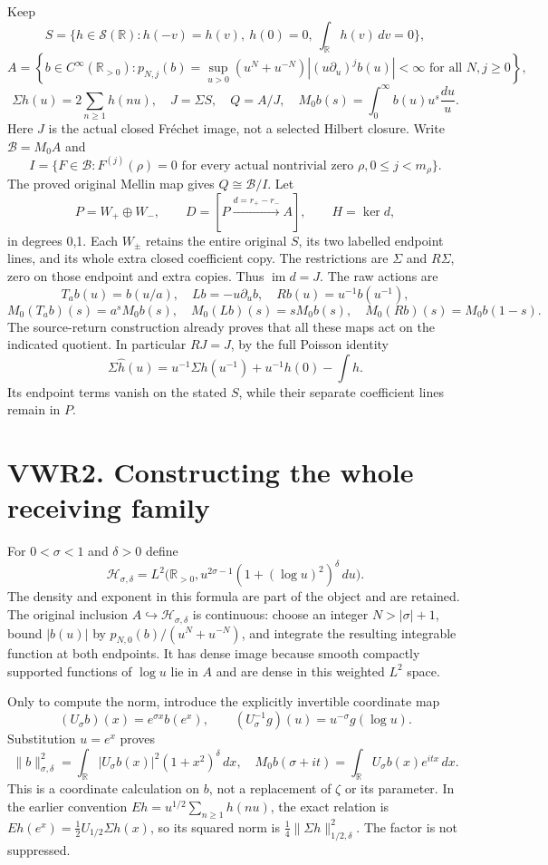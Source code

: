 Keep \[
S=\{h\in\mathcal S(\mathbb R):h(-v)=h(v),\ h(0)=0,\ \int_{\mathbb R}h(v)\,dv=0\},
\] \[
A=\left\{b\in C^\infty(\mathbb R_{>0}):
 p_{N,j}(b)=\sup_{u>0}(u^N+u^{-N})|(u\partial_u)^jb(u)|<\infty
 \text{ for all }N,j\ge0\right\},
\] \[
\Sigma h(u)=2\sum_{n\ge1}h(nu),\quad J=\Sigma S,\quad Q=A/J,
\quad M_0b(s)=\int_0^\infty b(u)u^s\frac{du}{u}.
\tag{VWR1.1}
\] Here \(J\) is the actual closed Fréchet image, not a selected Hilbert
closure. Write \(\mathcal B=M_0A\) and \[
I=\{F\in\mathcal B:F^{(j)}(\rho)=0\text{ for every actual nontrivial zero }\rho,
 0\le j<m_\rho\}.
\] The proved original Mellin map gives \(Q\cong\mathcal B/I\). Let \[
P=W_+\oplus W_-,\qquad D=[P\xrightarrow{d=r_+-r_-}A],\qquad H=\ker d,
\tag{VWR1.2}
\] in degrees 0,1. Each \(W_\pm\) retains the entire original \(S\), its
two labelled endpoint lines, and its whole extra closed coefficient
copy. The restrictions are \(\Sigma\) and \(R\Sigma\), zero on those
endpoint and extra copies. Thus \(\operatorname{im}d=J\). The raw
actions are \[
T_ab(u)=b(u/a),\quad Lb=-u\partial_ub,\quad Rb(u)=u^{-1}b(u^{-1}),
\] \[
M_0(T_ab)(s)=a^sM_0b(s),\quad M_0(Lb)(s)=sM_0b(s),\quad
M_0(Rb)(s)=M_0b(1-s).
\tag{VWR1.3}
\] The source-return construction already proves that all these maps act
on the indicated quotient. In particular \(RJ=J\), by the full Poisson
identity \[
\Sigma\widehat h(u)=u^{-1}\Sigma h(u^{-1})+u^{-1}h(0)-\int h.
\tag{VWR1.4}
\] Its endpoint terms vanish on the stated \(S\), while their separate
coefficient lines remain in \(P\).

\section{VWR2. Constructing the whole receiving
family}\label{vwr2.-constructing-the-whole-receiving-family}

For \(0<\sigma<1\) and \(\delta>0\) define \[
\mathcal H_{\sigma,\delta}
=L^2\bigl(\mathbb R_{>0},u^{2\sigma-1}(1+(\log u)^2)^\delta\,du\bigr).
\tag{VWR2.1}
\] The density and exponent in this formula are part of the object and
are retained. The original inclusion
\(A\hookrightarrow\mathcal H_{\sigma,\delta}\) is continuous: choose an
integer \(N>|\sigma|+1\), bound \(|b(u)|\) by
\(p_{N,0}(b)/(u^N+u^{-N})\), and integrate the resulting integrable
function at both endpoints. It has dense image because smooth compactly
supported functions of \(\log u\) lie in \(A\) and are dense in this
weighted \(L^2\) space.

Only to compute the norm, introduce the explicitly invertible coordinate
map \[
(U_\sigma b)(x)=e^{\sigma x}b(e^x),\qquad
(U_\sigma^{-1}g)(u)=u^{-\sigma}g(\log u).
\] Substitution \(u=e^x\) proves \[
\|b\|_{\sigma,\delta}^2
=\int_{\mathbb R}|U_\sigma b(x)|^2(1+x^2)^\delta\,dx,
\quad
M_0b(\sigma+it)=\int_{\mathbb R}U_\sigma b(x)e^{itx}\,dx.
\tag{VWR2.2}
\] This is a coordinate calculation on \(b\), not a replacement of
\(\zeta\) or its parameter. In the earlier convention
\(Eh=u^{1/2}\sum_{n\ge1}h(nu)\), the exact relation is
\(E h(e^x)=\tfrac12U_{1/2}\Sigma h(x)\), so its squared norm is
\(\tfrac14\|\Sigma h\|_{1/2,\delta}^2\). The factor is not suppressed.

